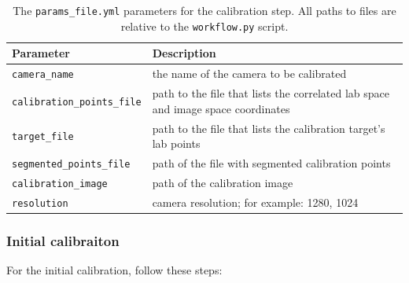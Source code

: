 \documentclass[10pt,a4paper]{article}
\begin{document}
\begin{table}
	\centering
	\caption{The \texttt{params\_file.yml} parameters for the calibration step. All paths to files are relative to the \texttt{workflow.py} script. \label{tab:cal_paramsfile}}
	\begin{tabular}{l m{10cm}}
		\hline
		Parameter & Description\\
		\hline
		\texttt{camera\_name} & the name of the camera to be calibrated \\
		
		\texttt{calibration\_points\_file} & path to the file that lists the correlated lab space and image space coordinates \\
		
		\texttt{target\_file} & path to the file that lists the calibration target's lab points \\
		
		\texttt{segmented\_points\_file} & path of the file with segmented calibration points \\
		
		\texttt{calibration\_image} & path of the calibration image \\
		
		\texttt{resolution} & camera resolution; for example: 1280, 1024\\
		\hline
	\end{tabular}
\end{table}





\subsubsection{Initial calibraiton}\label{sec:init_calibration}


For the initial calibration, follow these steps:
\end{document}
